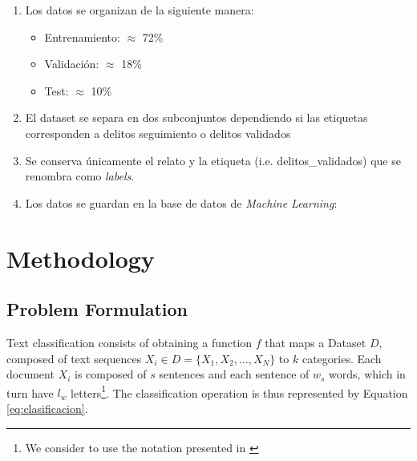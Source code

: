 \documentclass[onecolumn, journal, english, 12pt, a4paper]{IEEEtran} %
\theoremstyle{definition}
\begin{document}
\begin{enumerate}
        \item Los datos se organizan de la siguiente manera:
        \begin{itemize}
            \item Entrenamiento:  $\approx$ 72\%
            \item Validación:  $\approx$ 18\%
            \item Test:  $\approx$ 10\%
        \end{itemize}
        \item El dataset se separa en dos subconjuntos dependiendo si las etiquetas corresponden a delitos seguimiento o delitos validados
        \item Se conserva únicamente el relato y la etiqueta (i.e. delitos\_validados) que se renombra como \emph{labels}.
        \item Los datos se guardan en la base de datos de \emph{Machine Learning}:
        
    \end{enumerate}

\section{Methodology}\label{chap:metodos}
\subsection{Problem Formulation}

Text classification consists of obtaining a function $f$ that maps a
Dataset $D$, composed of text sequences
$X_i \in D=\{X_1, X_2, \dots, X_N\}$ to $k$ categories. Each document
$X_i$ is composed of $s$ sentences and each sentence of $w_s$ words,
which in turn have $l_w$ letters\footnote{We consider to use the
  notation presented in \cite{Kowsari2019}}. The classification
operation is thus represented by Equation \eqref{eq:clasificacion}.
\end{document}
